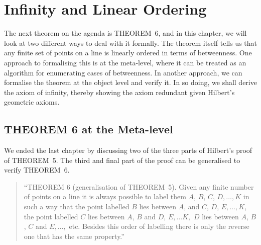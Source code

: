 \chapter{Infinity and Linear Ordering}\label{chapter:LinearOrder}
The next theorem on the agenda is THEOREM~6, and in this chapter, we will look at two different ways to deal with it formally. The theorem itself tells us that any finite set of points on a line is linearly ordered in terms of betweenness. One approach to formalising this is at the meta-level, where it can be treated as an algorithm for enumerating cases of betweenness. In another approach, we can formalise the theorem at the object level and verify it. In so doing, we shall derive the axiom of infinity, thereby showing the axiom redundant given Hilbert's geometric axioms.

\section{THEOREM 6 at the Meta-level}\label{sec:Theorem6}
We ended the last chapter by discussing two of the three parts of Hilbert's proof of THEOREM~5. The third and final part of the proof can be generalised to verify THEOREM~6.

\begin{quote}
  ``THEOREM 6 (generalisation of THEOREM~5). Given any finite number of points on a line it is always possible to label them $A$, $B$, $C$, $D, \ldots, K$ in such a way that the point labelled $B$ lies between $A$, and $C$, $D$, $E, \ldots, K$, the point labelled $C$ lies between $A$, $B$ and $D$, $E,\ldots K,$ $D$ lies between $A$, $B$, $C$ and $E, \ldots,$ etc. Besides this order of labelling there is only the reverse one that has the same property.''
\end{quote}

